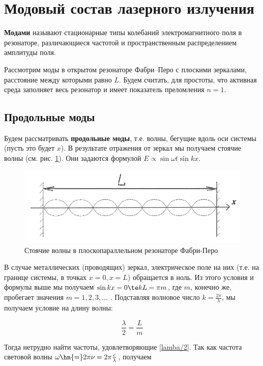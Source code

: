 \documentclass[12pt]{kiarticle}
\begin{document}
\section{Модовый состав лазерного излучения}

\textbf{Модами} называют стационарные типы колебаний электромагнитного поля в резонаторе, различающиеся частотой и пространственным распределением амплитуды поля.

Рассмотрим моды в открытом резонаторе Фабри–Перо с плоскими
зеркалами, расстояние между которыми равно $ L $. Будем считать, для
простоты, что активная среда заполняет весь резонатор и имеет показатель преломления $ n= 1 $.

\subsection{Продольные моды}

Будем рассматривать \textbf{продольные моды}, т.е. волны, бегущие вдоль оси системы (пусть это будет $ x $). В результате отражения от зеркал мы получаем стоячие волны (см. рис. \ref{FP_waves}). Они задаются формулой $ E \propto \sin{\omega t} \sin{kx} $.

\begin{figure}[h!]
	\centering
	\includegraphics[width=0.7\linewidth]{FP_waves.png}
	\caption{Стоячие волны в плоскопараллельном резонаторе Фабри-Перо}
	\label{FP_waves}
\end{figure}

В случае металлических (проводящих) зеркал, электрическое поле на них (т.е. на границе системы, в точках $ x = 0, x = L $) обращается в ноль. Из этого условия и формулы выше мы получаем $ \sin{kx} = 0 \te kL =\pi m $, где $ m $, конечно же, пробегает значения $ m = 1, 2, 3, ... $ .  Подставляя волновое число $ k = \frac{2\pi}{\lambda} $, мы получаем условие на длину волны:

\begin{equation}\label{lamba/2}
\dfrac{\lambda}{2} = \dfrac{L}{m}
\end{equation}

Тогда нетрудно найти частоты, удовлетворяющие \eqref{lamba/2}. Так как частота световой волны $ \omega \hm{=} 2\pi \nu = 2 \pi \frac{c}{\lambda} $, получаем 
\end{document}
